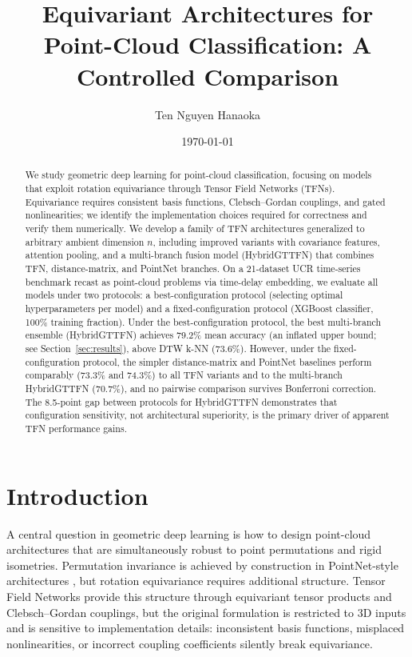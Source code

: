 \documentclass[a4paper,11pt]{article}
\author{Ten Nguyen Hanaoka}
\date{\today}
\title{Equivariant Architectures for Point-Cloud Classification: A Controlled Comparison}
\begin{document}
\maketitle

\begin{abstract}
We study geometric deep learning for point-cloud classification, focusing on models that exploit rotation equivariance through Tensor Field Networks (TFNs).
Equivariance requires consistent basis functions, Clebsch--Gordan couplings, and gated nonlinearities; we identify the implementation choices required for correctness and verify them numerically.
We develop a family of TFN architectures generalized to arbitrary ambient dimension $n$, including improved variants with covariance features, attention pooling, and a multi-branch fusion model (HybridGTTFN) that combines TFN, distance-matrix, and PointNet branches.
On a 21-dataset UCR time-series benchmark recast as point-cloud problems via time-delay embedding, we evaluate all models under two protocols: a best-configuration protocol (selecting optimal hyperparameters per model) and a fixed-configuration protocol (XGBoost classifier, 100\% training fraction).
Under the best-configuration protocol, the best multi-branch ensemble (HybridGTTFN) achieves 79.2\% mean accuracy (an inflated upper bound; see Section~\ref{sec:results}), above DTW k-NN (73.6\%).
However, under the fixed-configuration protocol, the simpler distance-matrix and PointNet baselines perform comparably (73.3\% and 74.3\%) to all TFN variants and to the multi-branch HybridGTTFN (70.7\%), and no pairwise comparison survives Bonferroni correction.
The 8.5-point gap between protocols for HybridGTTFN demonstrates that configuration sensitivity, not architectural superiority, is the primary driver of apparent TFN performance gains.
\end{abstract}

\tableofcontents

\section{Introduction}

A central question in geometric deep learning is how to design point-cloud architectures that are simultaneously robust to point permutations and rigid isometries.
Permutation invariance is achieved by construction in PointNet-style architectures \cite{pointnet2017,deepsets2017}, but rotation equivariance requires additional structure.
Tensor Field Networks \cite{tfn2018} provide this structure through equivariant tensor products and Clebsch--Gordan couplings, but the original formulation is restricted to 3D inputs and is sensitive to implementation details: inconsistent basis functions, misplaced nonlinearities, or incorrect coupling coefficients silently break equivariance.
\end{document}
